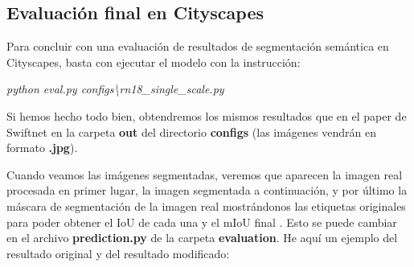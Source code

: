 \subsection{Evaluación final en Cityscapes}

Para concluir con una evaluación de resultados de segmentación semántica en Cityscapes, basta con ejecutar el modelo con la instrucción:

\begin{center}
\textit{python eval.py configs\textbackslash{rn18\_single\_scale.py}}
\end{center}

Si hemos hecho todo bien, obtendremos los mismos resultados que en el paper de Swiftnet \cite{swiftnet} en la carpeta \textbf{out} del directorio \textbf{configs} (las imágenes vendrán en formato \textbf{.jpg}).

Cuando veamos las imágenes segmentadas, veremos que aparecen la imagen real procesada en primer lugar, la imagen segmentada a continuación, y por último la máscara de segmentación de la imagen real mostrándonos las etiquetas originales para poder obtener el \ac{IoU} de cada una y el \ac{mIoU} final \cite{miou-iou}. Esto se puede cambiar en el archivo \textbf{prediction.py} de la carpeta \textbf{evaluation}. He aquí un ejemplo del resultado original y del resultado modificado:

